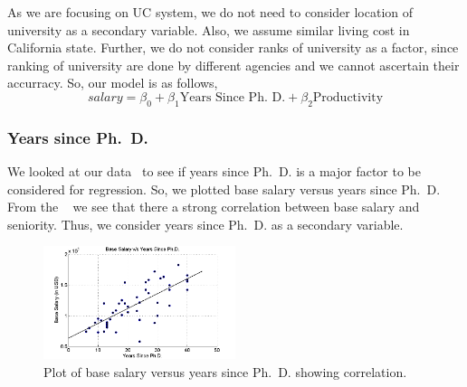 As we are focusing on UC system, we do not need to consider location of university as a secondary variable. Also, we assume similar living cost in California state. Further, we do not consider ranks of university as a factor, since ranking of university are done by different agencies and we cannot ascertain their accurracy. So, our model is as follows,
\begin{equation}
  \label{eqnourmodel}
  salary = \beta_0 + \beta_1 \text{Years Since Ph.~D.} + \beta_2 \text{Productivity}
\end{equation}

\subsubsection{Years since Ph.~D.}

We looked at our data~ to see if years since Ph.~D. is a major factor to be considered for regression. So, we plotted base salary versus years since Ph.~D. From the ~ we see that there a strong correlation between base salary and seniority. Thus, we consider years since Ph.~D. as a secondary variable.

\begin{figure}[h]
\label{figYearPhD}
\centering
\includegraphics[width=0.5\textwidth]{figures/yrPhD.png}
\caption{Plot of base salary versus years since Ph.~D. showing correlation.}
\end{figure}
